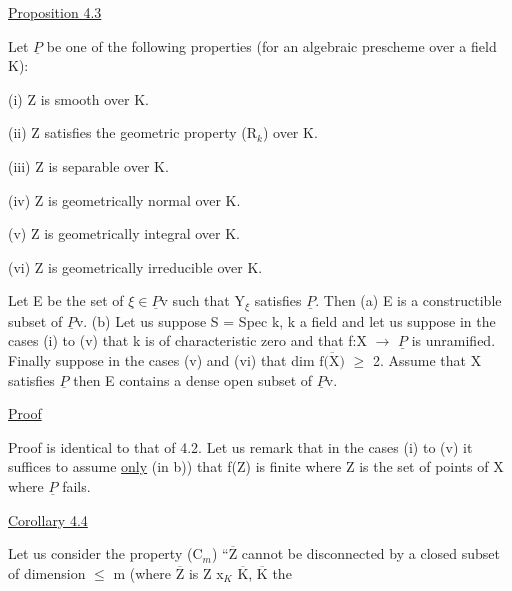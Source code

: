 
\uline{Proposition 4.3}

Let $\underline{P}$ be one of the following properties (for an algebraic
prescheme over a field K):

(i) Z is smooth over K.

(ii) Z satisfies the geometric property (R$_{k}$) over K.

(iii) Z is separable over K.

(iv) Z is geometrically normal over K.

(v) Z is geometrically integral over K.

(vi) Z is geometrically irreducible over K.

Let E be the set of $\xi \in \underline{P}$v such that Y$_{\xi}$ satisfies $\underline{P}$. Then (a) E is
a constructible subset of $\underline{P}$v. (b) Let us suppose S = Spec k, k a
field and let us suppose in the cases (i) to (v) that k is of
characteristic zero and that f:X $\to$ $\underline{P}$ is unramified.
Finally suppose in the cases (v) and (vi) that dim $\overline{\text{f(X)}}$ $\geq$ 2.
Assume that X satisfies $\underline{P}$ then E contains a dense open subset of
$\underline{P}$v.

\uline{Proof}

Proof is identical to that of 4.2. Let us remark that in the
cases (i) to (v) it suffices to assume \uline{only} (in b)) that f(Z) is
finite where Z is the set of points of X where $\underline{P}$ fails.

\uline{Corollary 4.4}

Let us consider the property (C$_{m}$) ``$\overline{\text{Z}}$ cannot be disconnected
by a closed subset of dimension $\leq$ m (where $\overline{\text{Z}}$ is Z x$_{K}$ $\overline{\text{K}}$, $\overline{\text{K}}$ the
